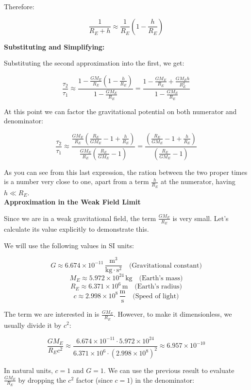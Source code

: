 \documentclass{article}
\begin{document}
Therefore:

\[
\frac{1}{R_E + h} \approx \frac{1}{R_E}\left(1 - \frac{h}{R_E}\right)
\]

\textbf{Substituting and Simplifying:}

Substituting the second approximation into the first, we get:

\[
\frac{\tau_2}{\tau_1} \approx \frac{1 - \frac{GM_E}{R_E}\left(1 - \frac{h}{R_E}\right)}{1 - \frac{GM_E}{R_E}} = \frac{1 - \frac{GM_E}{R_E} + \frac{GM_Eh}{R_E^2}}{1 - \frac{GM_E}{R_E}}
\]

At this point we can factor the gravitational potential on both numerator and denominator:


\[
\frac{\tau_2}{\tau_1} \approx \frac
{\frac{GM_E}{R_E}\left(\frac{R_E}{GM_E} - 1 + \frac{h}{R_E}\right)}
{\frac{GM_E}{R_E}\left(\frac{R_E}{GM_E} - 1\right)}
= \frac
{\left(\frac{R_E}{GM_E} - 1 + \frac{h}{R_E}\right)}
{\left(\frac{R_E}{GM_E} - 1\right)}
\]

As you can see from this last expression, the ration between the two proper times is a number very close to one, apart from a term $\frac{h}{R_E}$ at the numerator, having $h \ll R_E$.\\


\textbf{Approximation in the Weak Field Limit}

Since we are in a weak gravitational field, the term \(\frac{GM_E}{R_E}\) is very small. Let's calculate its value explicitly to demonstrate this.

We will use the following values in SI units:

\[
G \approx 6.674 \times 10^{-11} \, \frac{\mathrm{m^3}}{\mathrm{kg \cdot s^2}} \quad \text{(Gravitational constant)}
\]
\[
M_E \approx 5.972 \times 10^{24} \, \mathrm{kg} \quad \text{(Earth's mass)}
\]
\[
R_E \approx 6.371 \times 10^6 \, \mathrm{m} \quad \text{(Earth's radius)}
\]
\[
c \approx 2.998 \times 10^8 \, \frac{\mathrm{m}}{\mathrm{s}} \quad \text{(Speed of light)}
\]

The term we are interested in is $\frac{GM_E}{R_E}$. However, to make it dimensionless, we usually divide it by $c^2$:

\[
\frac{GM_E}{R_E c^2} \approx \frac{6.674 \times 10^{-11} \cdot 5.972 \times 10^{24}}{6.371 \times 10^6 \cdot (2.998 \times 10^8)^2} \approx 6.957 \times 10^{-10}
\]

In natural units, \(c = 1\) and \(G = 1\). We can use the previous result to evaluate \(\frac{GM_E}{R_E}\) by dropping the \(c^2\) factor (since \(c = 1\)) in the denominator:
\end{document}
